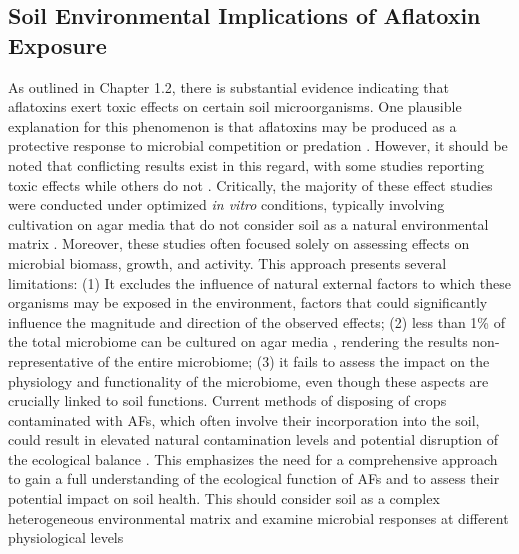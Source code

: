 \subsection{Soil Environmental Implications of Aflatoxin Exposure}

As outlined in Chapter 1.2, there is substantial evidence indicating that aflatoxins exert toxic effects on certain soil microorganisms. One plausible explanation for this phenomenon is that aflatoxins may be produced as a protective response to microbial competition or predation \citep{elmholt2008mycotoxins}. However, it should be noted that conflicting results exist in this regard, with some studies reporting toxic effects while others do not \citep{burmeister1966survey, arai1967antimicrobial, angle1981aflatoxin}. Critically, the majority of these effect studies were conducted under optimized \textit{in vitro} conditions, typically involving cultivation on agar media that do not consider soil as a natural environmental matrix \citep{drott2019fitness}. Moreover, these studies often focused solely on assessing effects on microbial biomass, growth, and activity. This approach presents several limitations: (1) It excludes the influence of natural external factors to which these organisms may be exposed in the environment, factors that could significantly influence the magnitude and direction of the observed effects; (2) less than 1\% of the total microbiome can be cultured on agar media \citep{pham2012cultivation}, rendering the results non-representative of the entire microbiome; (3) it fails to assess the impact on the physiology and functionality of the microbiome, even though these aspects are crucially linked to soil functions. Current methods of disposing of crops contaminated with AFs, which often involve their incorporation into the soil, could result in elevated natural contamination levels and potential disruption of the ecological balance \citep{fouche2020aflatoxins}. This emphasizes the need for a comprehensive approach to gain a full understanding of the ecological function of AFs and to assess their potential impact on soil health. This should consider soil as a complex heterogeneous environmental matrix and examine microbial responses at different physiological levels


